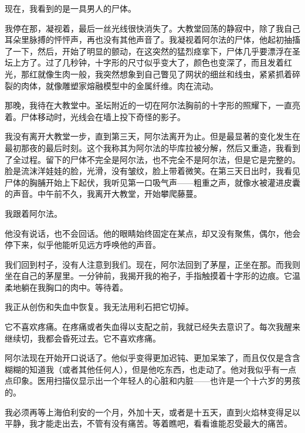 \documentclass[AutoFakeBold=true]{book}
\begin{document}
现在，我看到的是一具男人的尸体。

我停在那，凝视着，最后一丝光线很快消失了。大教堂回荡的静寂中，除了我自己耳朵里脉搏的怦怦声，再也没有其他声音了。我凝视着阿尔法的尸体，他起初抽搐了一下，然后，开始了明显的颤动，在这突然的猛烈痉挛下，尸体几乎要漂浮在圣坛上方了。过了几秒钟，十字形的尺寸似乎变大了，颜色也变深了，而且发着红光，那红就像生肉一般，我突然想象到自己瞥见了网状的细丝和线虫，紧紧抓着碎裂的肉体，就像雕塑家熔融模型中的金属纤维。肉在流动。

那晚，我待在大教堂中。圣坛附近的一切在阿尔法胸前的十字形的照耀下，一直亮着。尸体移动时，光线会在墙上投下奇怪的影子。

我没有离开大教堂一步，直到第三天，阿尔法离开为止。但是最显著的变化发生在最初那夜的最后时刻。这个我称其为阿尔法的毕库拉被分解，然后又重造，我看到了全过程。留下的尸体不完全是阿尔法，也不完全不是阿尔法，但是它是完整的。脸是流沫洋娃娃的脸，光滑，没有皱纹，脸上带着微笑。在第三天日出时，我看见尸体的胸脯开始上下起伏，我听见第一口吸气声——粗重之声，就像水被灌进皮囊的声音。中午前不久，我离开大教堂，开始攀爬藤蔓。

我跟着阿尔法。

他没有说话，也不会回话。他的眼睛始终固定在某点，却又没有聚焦，偶尔，他会停下来，似乎他能听见远方呼唤他的声音。

我们回到村子，没有人注意到我们。现在，阿尔法回到了茅屋，正坐在那。而我则坐在自己的茅屋里。一分钟前，我揭开我的袍子，手指触摸着十字形的边痕。它温柔地躺在我胸口的肉中。等待着。

\vspace*{1em}{\kaishu 第一百四十日：}

我正从创伤和失血中恢复。我无法用利石把它切掉。

它不喜欢疼痛。在疼痛或者失血得以支配之前，我就已经失去意识了。每次我醒来继续切，我都会昏死过去。它不喜欢疼痛。

\vspace*{1em}{\kaishu 第一百五十八日：}

阿尔法现在开始开口说话了。他似乎变得更加迟钝、更加呆笨了，而且仅仅是含含糊糊的知道我（或者其他任何人），但是他吃东西，也走动了。他对我似乎有一点点印象。医用扫描仪显示出一个年轻人的心脏和内脏——也许是一个十六岁的男孩的。

我必须再等上海伯利安的一个月，外加十天，或者是十五天，直到火焰林变得足以平静，我才能走出去，不管有没有痛苦。等着瞧吧，看看谁能忍受最大的痛苦。

\vspace*{1em}{\kaishu 第一百七十三日：}
\end{document}
